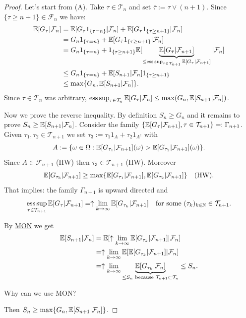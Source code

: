 \begin{proof}
    Let's start from (A). Take $\tau \in \mathcal{T}_n$ and set $\bar{\tau} := \tau \vee (n+1)$.
    Since $\{\tau \ge n+1\} \in \mathcal{F}_n$ we have:
    \begin{align*}
        \mathbb E[G_\tau | \mathcal{F}_n] &= \mathbb E[G_\tau 1_{\{\tau = n\}} | \mathcal{F}_n] + \mathbb E[G_\tau 1_{\{\tau \ge n+1\}} | \mathcal{F}_n] \\
        &= G_n 1_{\{\tau = n\}} + \mathbb E[G_{\bar{\tau}} 1_{\{\tau \ge n+1\}} | \mathcal{F}_n] \\
        &= G_n 1_{\{\tau = n\}} + 1_{\{\tau \ge n+1\}} \mathbb E[\underbrace{\mathbb E[G_{\bar{\tau}} | \mathcal{F}_{n+1}]}_{\le \operatorname*{ess\,sup}_{\tau \in \mathcal{T}_{n+1}} \mathbb E[G_\tau | \mathcal{F}_{n+1}]} | \mathcal{F}_n] \\
        &\le G_n 1_{\{\tau = n\}} + \mathbb E[S_{n+1} | \mathcal{F}_n] 1_{\{\tau \ge n+1\}} \\
        &\le \max \{G_n, \mathbb E[S_{n+1} | \mathcal{F}_n]\}.
    \end{align*}
    Since $\tau \in \mathcal{T}_n$ was arbitrary, $\operatorname*{ess\,sup}_{\tau \in \mathcal{T}_n} \mathbb E[G_\tau | \mathcal{F}_n] \le \max(G_n, \mathbb E[S_{n+1} | \mathcal{F}_n])$.

    Now we prove the reverse inequality. By definition $S_n \ge G_n$ and it remains to prove $S_n \ge \mathbb E[S_{n+1} | \mathcal{F}_n]$.
    Consider the family $\{\mathbb E[G_\tau | \mathcal{F}_{n+1}], \tau \in \mathcal{T}_{n+1}\} =: \Gamma_{n+1}$.
    Given $\tau_1, \tau_2 \in \mathcal{T}_{n+1}$ we set $\tau_3 := \tau_1 1_A + \tau_2 1_{A^c}$ with
    $$A := \{\omega \in \Omega : \mathbb E[G_{\tau_1} | \mathcal{F}_{n+1}](\omega) > \mathbb E[G_{\tau_2} | \mathcal{F}_{n+1}](\omega)\}.$$
    Since $A \in \mathcal{F}_{n+1}$ (HW) then $\tau_3 \in \mathcal{T}_{n+1}$ (HW). Moreover
    $$\mathbb E[G_{\tau_3} | \mathcal{F}_{n+1}] \ge \max \{\mathbb E[G_{\tau_1} | \mathcal{F}_{n+1}], \mathbb E[G_{\tau_2} | \mathcal{F}_{n+1}]\} \quad \text{(HW)}.$$
    That implies: the family $\Gamma_{n+1}$ is upward directed and
    $$\operatorname*{ess\,sup}_{\tau \in \mathcal{T}_{n+1}} \mathbb E[G_\tau | \mathcal{F}_{n+1}] = \uparrow \lim_{k \to \infty} \mathbb E[G_{\tau_k} | \mathcal{F}_{n+1}] \quad \text{for some } (\tau_k)_{k \in \mathbb N} \in \mathcal{T}_{n+1}.$$
    
    By \underline{MON} we get
    \begin{align*}
        \mathbb E[S_{n+1} | \mathcal{F}_n] &= \mathbb E[\uparrow \lim_{k \to \infty} \mathbb E[G_{\tau_k} | \mathcal{F}_{n+1}] | \mathcal{F}_n] \\
        &= \uparrow \lim_{k \to \infty} \mathbb E[\mathbb E[G_{\tau_k} | \mathcal{F}_{n+1}] | \mathcal{F}_n] \\
        &= \uparrow \lim_{k \to \infty} \underbrace{\mathbb E[G_{\tau_k} | \mathcal{F}_n]}_{\le S_n \text{ because } \mathcal{T}_{n+1} \subset \mathcal{T}_n} \le S_n.
    \end{align*}
    \begin{homework}
        Why can we use MON?
    \end{homework}
    Then $S_n \ge \max \{G_n, \mathbb E[S_{n+1} | \mathcal{F}_n]\}$.


\end{proof}

